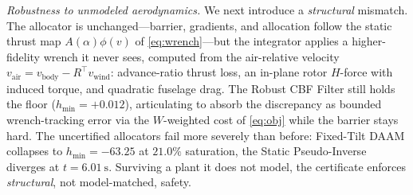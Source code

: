 \documentclass[letter, 10 pt, journal, twoside]{IEEEtran}
\theoremstyle{compact}
\begin{document}

\emph{Robustness to unmodeled aerodynamics.} We next introduce a \emph{structural} mismatch. The allocator is unchanged---barrier, gradients, and allocation follow the static thrust map $A(\alpha)\phi(v)$ of \eqref{eq:wrench}---but the integrator applies a higher-fidelity wrench it never sees, computed from the air-relative velocity $v_{\mathrm{air}} = v_{\mathrm{body}} - R^{\!\top}v_{\mathrm{wind}}$: advance-ratio thrust loss, an in-plane rotor $H$-force with induced torque, and quadratic fuselage drag. The Robust \ac{CBF} Filter still holds the floor ($h_{\min}=+0.012$), articulating to absorb the discrepancy as bounded wrench-tracking error via the $W$-weighted cost of \eqref{eq:obj} while the barrier stays hard. The uncertified allocators fail more severely than before: Fixed-Tilt \ac{DAAM} collapses to $h_{\min}=-63.25$ at $21.0\%$ saturation, the Static Pseudo-Inverse diverges at $t=\SI{6.01}{\second}$. Surviving a plant it does not model, the certificate enforces \emph{structural}, not model-matched, safety.


\end{document}
